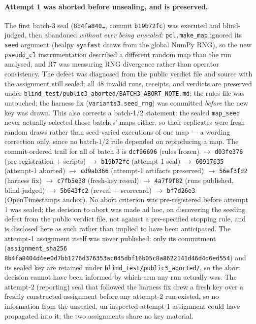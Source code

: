 \documentclass[11pt]{article}
\begin{document}
\begin{sloppypar}
\paragraph{Attempt 1 was aborted before unsealing, and is preserved.} The
first batch-3 seal (\texttt{8b4fa840\ldots}, commit \texttt{b19b72fc}) was
executed and blind-judged, then abandoned \emph{without ever being
unsealed}: \texttt{pcl.make\_map} ignored its \texttt{seed} argument (healpy
\texttt{synfast} draws from the global NumPy RNG), so the new
\texttt{pseudo\_cl} instrumentation described a different random map than
the run analysed, and R7 was measuring RNG divergence rather than operator
consistency. The defect was diagnosed from the public verdict file and
source with the assignment still sealed; all 48 invalid runs, receipts, and
verdicts are preserved under
\nolinkurl{blind_test/public3_aborted/BATCH3_ABORT_NOTE.md}; the rules file
was untouched; the harness fix (\texttt{variants3.seed\_rng}) was committed
\emph{before} the new key was drawn. This also corrects a batch-1/2
statement: the sealed \texttt{map\_seed} never actually selected those
batches' maps either, so their replicates were fresh random draws rather
than seed-varied executions of one map --- a wording correction only, since
no batch-1/2 rule depended on reproducing a map. The commit-ordered trail
for all of batch 3 is
\texttt{dcf96696} (rules frozen) \(\rightarrow\) \texttt{d03fe376}
(pre-registration + scripts) \(\rightarrow\) \texttt{b19b72fc} (attempt-1
seal) \(\rightarrow\) \texttt{60917635} (attempt-1 aborted) \(\rightarrow\)
\texttt{cd9ab366} (attempt-1 artifacts preserved) \(\rightarrow\)
\texttt{56ef3fd2} (harness fix) \(\rightarrow\) \texttt{c7fb5e38} (fresh-key
reseal) \(\rightarrow\) \texttt{4a7f9f82} (runs published, blind-judged)
\(\rightarrow\) \texttt{5b643fc2} (reveal + scorecard) \(\rightarrow\)
\texttt{bf7d26e3} (OpenTimestamps anchor). No abort criterion was
pre-registered before attempt 1 was sealed; the decision to abort was made
ad hoc, on discovering the seeding defect from the public verdict file, not
against a pre-specified stopping rule, and is disclosed here as such rather
than implied to have been anticipated. The attempt-1 assignment itself was
never published: only its commitment (\texttt{assignment\_sha256}
\texttt{8b4fa8404d4ee0d7bb1276d376353ac045dbf16b05c8a8622141d46d4d6ed554})
and its sealed key are retained under
\nolinkurl{blind_test/public3_aborted/}, so the abort decision cannot have
been informed by which arm any run actually was. The attempt-2 (reporting)
seal that followed the harness fix drew a fresh key over a freshly
constructed assignment before any attempt-2 run existed, so no information
from the unsealed, un-inspected attempt-1 assignment could have propagated
into it; the two assignments share no key material.
\end{sloppypar}
\end{document}
